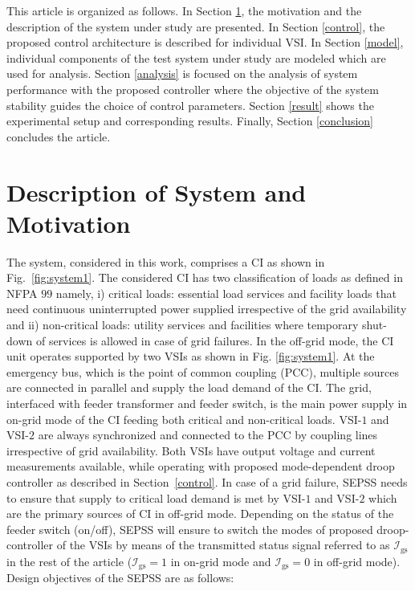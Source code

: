 \documentclass[journal]{IEEEtran}
\begin{document}
\par This article is organized as follows. In Section \ref{motivation}, the motivation and the description of the system under study are presented. In Section \ref{control}, the proposed control architecture is described for individual VSI. In Section \ref{model}, individual components of the test system under study are modeled which are used for analysis. Section \ref{analysis} is focused on the analysis of system performance with the proposed controller where the objective of the system stability guides the choice of control parameters. Section \ref{result} shows the experimental setup and corresponding results. Finally, Section \ref{conclusion} concludes the article.
\section{Description of System and Motivation}\label{motivation}
The system, considered in this work, comprises a CI as shown in Fig.~\ref{fig:system1}. The considered CI has two classification of loads as defined in NFPA $99$ \cite{nfpa99} namely, i) critical loads: essential load services and facility loads that need continuous uninterrupted power supplied irrespective of the grid availability and ii) non-critical loads: utility services and facilities where temporary shut-down of services is allowed in case of grid failures. In the off-grid mode, the CI unit operates supported by two VSIs as shown in Fig. \ref{fig:system1}. At the emergency bus, which is the point of common coupling (PCC), multiple sources are connected in parallel and supply the load demand of the CI. The grid, interfaced with feeder transformer and feeder switch, is the main power supply in on-grid mode of the CI feeding both critical and non-critical loads. VSI-$1$ and VSI-$2$ are always synchronized and connected to the PCC by coupling lines irrespective of grid availability. Both VSIs have output voltage and current measurements available, while operating with proposed mode-dependent droop controller as described in Section~\ref{control}. In case of a grid failure, SEPSS needs to ensure that supply to critical load demand is met by VSI-$1$ and VSI-$2$ which are the primary sources of CI in off-grid mode. Depending on the status of the feeder switch (on/off), SEPSS will ensure to switch the modes of proposed droop-controller of the VSIs by means of the transmitted status signal referred to as $\mathcal{I}_\mathrm{gs}$ in the rest of the article ($\mathcal{I}_\mathrm{gs}=1$ in on-grid mode and $\mathcal{I}_\mathrm{gs}=0$ in off-grid mode). Design objectives of the SEPSS are as follows:
\end{document}
